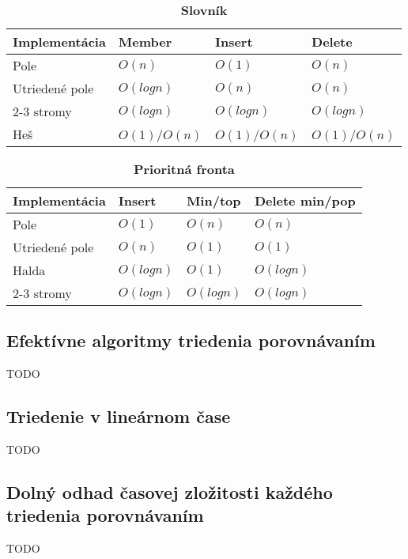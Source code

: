 		\begin{table}[h]
			\centering
			\caption{\textbf{Slovník}}
			\label{my-label}
			\begin{tabular}{|l|l|l|l|}
			\hline
			\textbf{Implementácia} & \textbf{Member} & \textbf{Insert} & \textbf{Delete}  \\ \hline
			Pole                   & $O(n)$            & $O(1)$           & $O(n)$             \\ \hline
			Utriedené pole         & $O(log n)$        & $O(n)$            & $O(n)$             \\ \hline
			2-3 stromy             & $O(log n)$        & $O(log n)$        & $O(log n)$          \\ \hline
			Heš                    & $O(1)$/$O(n)$      & $O(1)$/$O(n)$       & $O(1)$/$O(n)$        \\ \hline
			\end{tabular}
		\end{table}

		\begin{table}[h]
			\centering
			\caption{\textbf{Prioritná fronta}}
			\label{my-label}
			\begin{tabular}{|l|l|l|l|}
			\hline
			\textbf{Implementácia} & \textbf{Insert} & \textbf{Min/top} & \textbf{Delete min/pop}   \\ \hline
			Pole                   & $O(1)$            & $O(n)$             & $O(n)$                       \\ \hline
			Utriedené pole         & $O(n)$            & $O(1)$             & $O(1)$                       \\ \hline
			Halda                  & $O(log n)$        & $O(1)$             & $O(log n)$                  \\ \hline
			2-3 stromy             & $O(log n)$        & $O(log n)$         & $O(log n)$                   \\ \hline
			\end{tabular}
		\end{table}


	\subsection{Efektívne algoritmy triedenia porovnávaním} TODO
	\subsection{Triedenie v lineárnom čase} TODO
	\subsection{Dolný odhad časovej zložitosti každého triedenia porovnávaním} TODO

